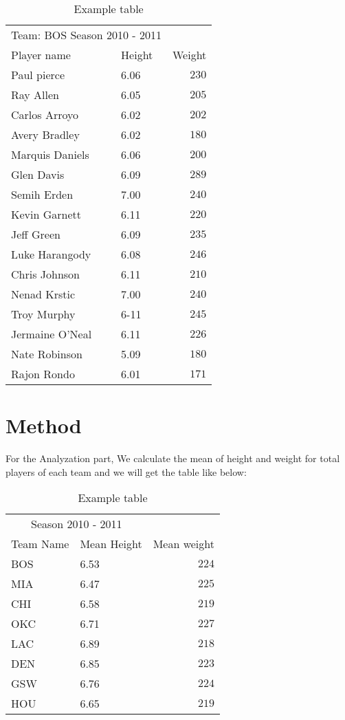 \documentclass[twoside]{article}
\begin{document}
\begin{multicols}{2}
\begin{table}[H]
\begin{tabular}{llr}
\bottomrule
\end{tabular}
\end{table}


\begin{table}[H]
\caption{Example table}
\centering
\begin{tabular}{llr}
\toprule
\multicolumn{2}{c}{Team: BOS Season 2010 - 2011} \\
\cmidrule(r){1-2}
Player name & Height & Weight \\
\midrule
Paul pierce & 6.06 & $230$\\
Ray Allen	& 6.05 & $205$\\	
Carlos Arroyo & 6.02 & $202$\\	
Avery Bradley & 6.02 & $180$\\	
Marquis Daniels	& 6.06 & $200$\\
Glen Davis &6.09& $289$\\	
Semih Erden	&7.00& $240$\\	
Kevin Garnett &6.11& $220$\\	
Jeff Green &6.09& $235$\\	
Luke Harangody	&6.08&	$246$\\	
Chris Johnson	&6.11& $210$\\	
Nenad Krstic	&7.00& $240$\\
Troy Murphy	&6-11& $245$\\	
Jermaine O'Neal	&6.11&	$226$\\	
Nate Robinson &5.09& $180$\\
Rajon Rondo	&6.01& $171$\\	


\bottomrule
\end{tabular}
\end{table}


\section{Method}


For the Analyzation part, We calculate the mean of height and weight for total players of each team and we will get the table like below:

\begin{table}[H]
\caption{Example table}
\centering
\begin{tabular}{llr}
\toprule
\multicolumn{2}{c}{Season 2010 - 2011} \\
\cmidrule(r){1-2}
Team Name & Mean Height & Mean weight \\
\midrule
BOS & 6.53 & $224$\\
MIA	& 6.47 & $225$\\	
CHI & 6.58 & $219$\\	
OKC & 6.71 & $227$\\	
LAC	& 6.89 & $218$\\
DEN & 6.85 & $223$\\	
GSW	& 6.76 & $224$\\	
HOU & 6.65 & $219$\\	
\bottomrule
\end{tabular}
\end{table}


\end{multicols}
\end{document}

